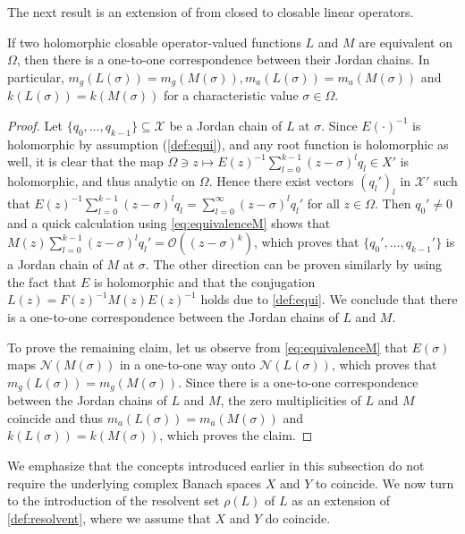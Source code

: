 \documentclass[english]{myarticle}
\begin{document}
\begin{sloppypar}
The next result is an extension of \cite[Proposition 1.2]{Kaashoek1992} from closed to closable linear operators.

\begin{proposition} \label{prop:equivalent chains}
If two holomorphic closable operator-valued functions $L$ and $M$ are equivalent on $\Omega$, then there is a one-to-one correspondence between their Jordan chains. In particular, $m_g(L(\sigma)) = m_g(M(\sigma)), m_a(L(\sigma)) = m_a(M(\sigma))$ and $k(L(\sigma)) = k(M(\sigma))$ for a characteristic value $\sigma \in \Omega$.
\end{proposition}
\begin{proof}
Let $\{q_0,\dots,q_{k-1}\} \subseteq \mathcal{X}$ be a Jordan chain of $L$ at $\sigma$. Since $E(\cdot)^{-1}$ is holomorphic by assumption (\cref{def:equi}), and any root function is holomorphic as well, it is clear that the map $\Omega \ni z \mapsto E(z)^{-1} \sum_{l=0}^{k-1}(z-\sigma)^lq_l \in X'$ is holomorphic, and thus analytic on $\Omega$. Hence there exist vectors $(q_l')_l$ in $\mathcal{X}'$ such that $E(z)^{-1} \sum_{l=0}^{k-1}(z-\sigma)^lq_l = \sum_{l=0}^\infty (z-\sigma)^l q_l'$ for all $z \in \Omega$. Then $q_0' \neq 0$ and a quick calculation using \eqref{eq:equivalenceM} shows that $M(z)\sum_{l=0}^{k-1}(z-\sigma)^lq_l' = \mathcal{O}((z-\sigma)^k)$, which proves that $\{q_0',\dots,q_{k-1}'\}$ is a Jordan chain of $M$ at $\sigma$. The other direction can be proven similarly by using the fact that $E$ is holomorphic and that the conjugation $L(z) = F(z)^{-1} M(z) E(z)^{-1}$ holds due to \cref{def:equi}. We conclude that there is a one-to-one correspondence between the Jordan chains of $L$ and $M$. 

To prove the remaining claim, let us observe from \eqref{eq:equivalenceM} that $E(\sigma)$ maps $\mathcal{N}(M(\sigma))$ in a one-to-one way onto $\mathcal{N}(L(\sigma))$, which proves that $m_g(L(\sigma)) = m_g(M(\sigma))$. Since there is a one-to-one correspondence between the Jordan chains of $L$ and $M$, the zero multiplicities of $L$ and $M$ coincide and thus $m_a(L(\sigma)) = m_a(M(\sigma))$ and $k(L(\sigma)) = k(M(\sigma))$, which proves the claim.
\end{proof}

We emphasize that the concepts introduced earlier in this subsection do not require the underlying complex Banach spaces $X$ and $Y$ to coincide. We now turn to the introduction of the resolvent set $\rho(L)$ of $L$ as an extension of \cref{def:resolvent}, where we assume that $X$ and $Y$ do coincide.


\end{sloppypar}
\end{document}
